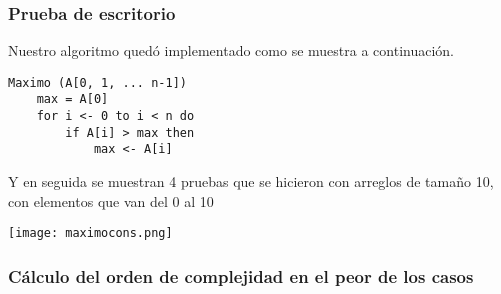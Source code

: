\documentclass[12pt,twoside]{article}
\begin{document}
\subsubsection{Prueba de escritorio}
Nuestro algoritmo quedó implementado como se muestra a continuación.
\begin{lstlisting}
Maximo (A[0, 1, ... n-1])
    max = A[0]
    for i <- 0 to i < n do
        if A[i] > max then
            max <- A[i]
\end{lstlisting}
Y en seguida se muestran 4 pruebas que se hicieron con arreglos de tamaño 10, con 
elementos que van del 0 al 10
\begin{center}
    \texttt{[image: maximocons.png]}
\end{center}
\subsubsection{Cálculo del orden de complejidad en el peor de los casos}
\end{document}
